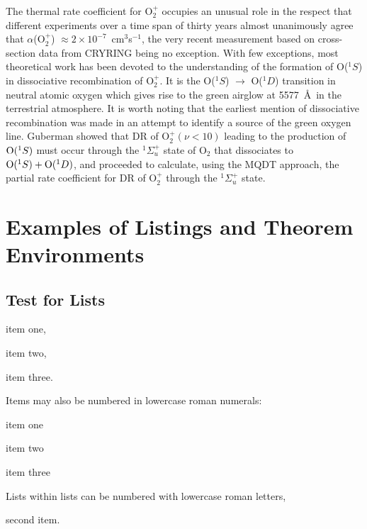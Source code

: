 \documentclass{ws-rv9x6}
\begin{document}
The thermal rate coefficient for O$_2^+$ occupies an unusual role in
the respect that different experiments over a time span of thirty
years almost unanimously agree\cite{2} that $\alpha$(O$_2^+$) $\approx
2 \times 10^{-7}$~cm$^3$s$^{-1}$, the very recent measurement based on
cross-section data from CRYRING being no exception.\cite{86} With few
exceptions,\cite{87} most theoretical work has been devoted to the
understanding of the formation of O($^1S$) in dissociative 
recombination of O$_2^+$. It is the O($^1S$) $\to$ O($^1D$) transition
in neutral atomic oxygen which gives rise to the green
airglow at 5577~\AA\ in the terrestrial
atmosphere. It is worth noting that the earliest mention of
dissociative recombination was made in an attempt to identify a source
of the green oxygen line.\cite{88}
Guberman showed\cite{89,90} that DR of O$_2^+ (\nu < 10)$ leading to
the production of ${\rm O}(^1S)$ must occur through the $^1
\Sigma_u^+$ state of O$_2$ that dissociates to ${\rm O}(^1S) + {\rm
O}(^1D)$, and proceeded to calculate, using the MQDT approach,
the partial rate coefficient for DR of O$_2^+$ through the $^1 \Sigma_u^+$
state.\cite{91} 

\section*{Examples of Listings and Theorem Environments}

\subsection*{Test for Lists}

\begin{itemlist}
 \item item one,
 \item item two,
\item item three.
\end{itemlist}
Items may also be numbered in lowercase roman numerals:
\begin{romanlist}
\item item one
\item item two
\item item three
	\begin{romanlist}[(b)]
	\item Lists within lists can be numbered with lowercase 
              roman letters,
	\item second item. 
	\end{romanlist}
\end{romanlist}
\end{document}
